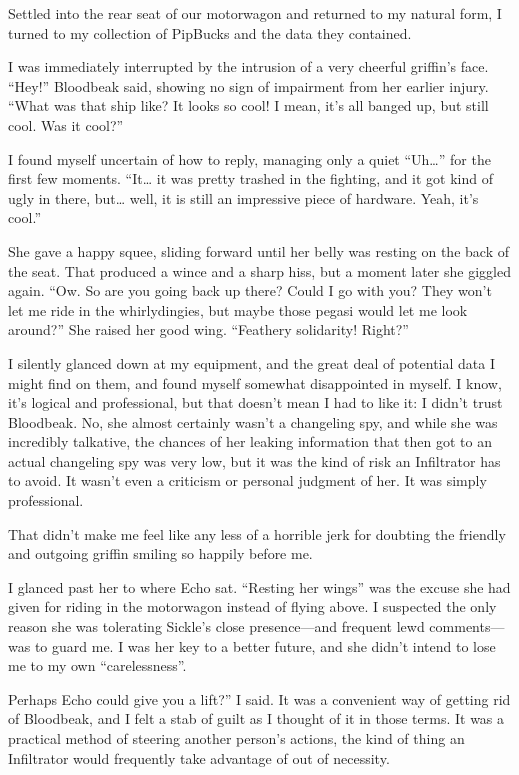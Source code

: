 Settled into the rear seat of our motorwagon and returned to my natural form, I turned to my collection of PipBucks and the data they contained.

I was immediately interrupted by the intrusion of a very cheerful griffin’s face. “Hey!” Bloodbeak said, showing no sign of impairment from her earlier injury. “What was that ship like? It looks so cool! I mean, it’s all banged up, but still cool. Was it cool?”

I found myself uncertain of how to reply, managing only a quiet “Uh…” for the first few moments. “It… it was pretty trashed in the fighting, and it got kind of ugly in there, but… well, it is still an impressive piece of hardware. Yeah, it’s cool.”

She gave a happy squee, sliding forward until her belly was resting on the back of the seat. That produced a wince and a sharp hiss, but a moment later she giggled again. “Ow. So are you going back up there? Could I go with you? They won’t let me ride in the whirlydingies, but maybe those pegasi would let me look around?” She raised her good wing. “Feathery solidarity! Right?”

I silently glanced down at my equipment, and the great deal of potential data I might find on them, and found myself somewhat disappointed in myself. I know, it’s logical and professional, but that doesn’t mean I had to like it: I didn’t trust Bloodbeak. No, she almost certainly wasn’t a changeling spy, and while she was incredibly talkative, the chances of her leaking information that then got to an actual changeling spy was very low, but it was the kind of risk an Infiltrator has to avoid. It wasn’t even a criticism or personal judgment of her. It was simply professional.

That didn’t make me feel like any less of a horrible jerk for doubting the friendly and outgoing griffin smiling so happily before me.

I glanced past her to where Echo sat. “Resting her wings” was the excuse she had given for riding in the motorwagon instead of flying above. I suspected the only reason she was tolerating Sickle’s close presence—and frequent lewd comments—was to guard me. I was her key to a better future, and she didn’t intend to lose me to my own “carelessness”.

\leavevmode{}Perhaps Echo could give you a lift?” I said. It was a convenient way of getting rid of Bloodbeak, and I felt a stab of guilt as I thought of it in those terms. It was a practical method of steering another person’s actions, the kind of thing an Infiltrator would frequently take advantage of out of necessity.

